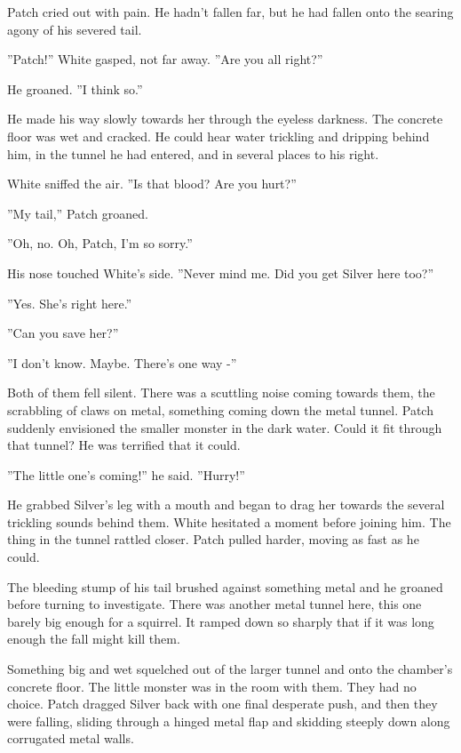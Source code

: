 \documentclass[12pt]{book}
\begin{document}
 Patch cried out with pain. He hadn't fallen far, but he had fallen onto the searing agony of his severed tail.\par
 ''Patch!'' White gasped, not far away. ''Are you all right?''\par
 He groaned. ''I think so.''\par
 He made his way slowly towards her through the eyeless darkness. The concrete floor was wet and cracked. He could hear water trickling and dripping behind him, in the tunnel he had entered, and in several places to his right.\par
 White sniffed the air. ''Is that blood? Are you hurt?''\par
 ''My tail,'' Patch groaned.\par
 ''Oh, no. Oh, Patch, I'm so sorry.''\par
 His nose touched White's side. ''Never mind me. Did you get Silver here too?''\par
 ''Yes. She's right here.''\par
 ''Can you save her?''\par
 ''I don't know. Maybe. There's one way -''\par
 Both of them fell silent. There was a scuttling noise coming towards them, the scrabbling of claws on metal, something coming down the metal tunnel. Patch suddenly envisioned the smaller monster in the dark water. Could it fit through that tunnel? He was terrified that it could.\par
 ''The little one's coming!'' he said. ''Hurry!''\par
 He grabbed Silver's leg with a mouth and began to drag her towards the several trickling sounds behind them. White hesitated a moment before joining him. The thing in the tunnel rattled closer. Patch pulled harder, moving as fast as he could.\par
The bleeding stump of his tail brushed against something metal and he groaned before turning to investigate. There was another metal tunnel here, this one barely big enough for a squirrel. It ramped down so sharply that if it was long enough the fall might kill them.\par
Something big and wet squelched out of the larger tunnel and onto the chamber's concrete floor. The little monster was in the room with them. They had no choice. Patch dragged Silver back with one final desperate push, and then they were falling, sliding through a hinged metal flap and skidding steeply down along corrugated metal walls.\par
\end{document}
